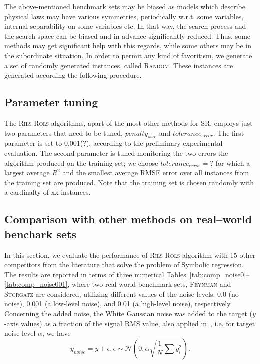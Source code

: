 \documentclass[a4paper,12pt]{elsarticle}
\begin{document}
The above-mentioned benchmark sets may be biased as models which describe physical laws may have various symmetries, periodically w.r.t. some variables, internal separability on some variables etc. In that way, the search process and the search space can be biased and in-advance significantly reduced. Thus, some methods may get significant help with this regards, while some others may be in the subordinate situation. 
  In order to permit any kind of favoritism, we generate a set of randomly generated instances, called \textsc{Random}. These instances are generated according the following procedure. 


\subsection{Parameter tuning}
The \textsc{Rils}-\textsc{Rols} algorithms, apart of the most other methods for SR, employs just two parameters that need to be tuned, $penalty_{size}$ and $tolerance_{error}$. The first parameter is set to 0.001(?), according to the preliminary experimental evaluation. The second parameter is tuned monitoring the two errors the algorithm produced on the training set; we choose $tolerance_{error}=?$ for which a largest average $R^2$ and the smallest average RMSE error over all instances from the training set are produced. Note that the training set is chosen randomly with a cardinalty of xx instances. 


\subsection{Comparison with other methods on real--world benchark sets}
In this section, we evaluate the performance of \textsc{Rils-Rols} algorithm with 15 other competitors from the literature that solve the problem of Symbolic regression. The results are reported in terms of three numerical Tables~\ref{tab:comp_noise0}--\ref{tab:comp_noise001}, where two real-world benchmark sets, \textsc{Feynman} and \textsc{Storgatz} are considered, utilizing  different values of the noise levels: 0.0 (no noise), 0.001 (a low-level noise), and 0.01 (a high-level noise), respectively. Concerning the added noise, the White Gaussian noise was added to the target ($y$-axis values) as a fraction of the signal RMS value, also applied in~\cite{la2021contemporary}, i.e. for target noise level $\alpha$, we have
$$ y_{noise} = y + \epsilon, \epsilon \sim \mathcal{N}\left(0, \alpha \sqrt{\frac{1}{N} \sum {y_i^2}}\right). $$
\end{document}

